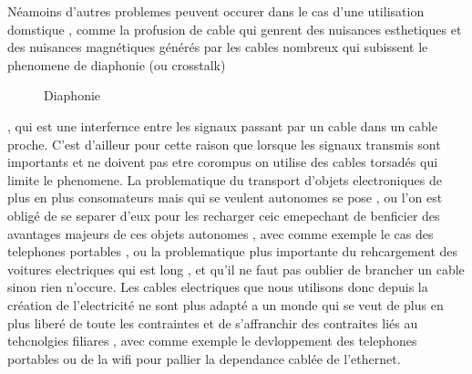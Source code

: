 \documentclass[12pt]{report}
\begin{document}
	Néamoins d'autres problemes peuvent occurer dans le cas d'une utilisation domstique , comme la profusion de cable qui genrent des nuisances esthetiques et des nuisances magnétiques générés par les cables nombreux qui subissent le phenomene de diaphonie (ou crosstalk)\cite{wiki4}
\begin{figure}
  \begin{center}
    \setlength\fboxsep{0pt}
    \setlength\fboxrule{0.5pt}
  \end{center}
  \caption{Diaphonie}
\end{figure}, qui est une interfernce entre les signaux passant par un cable dans un cable proche. C'est d'ailleur pour cette raison que lorsque les signaux transmis sont importants et ne doivent pas etre corompus on utilise des cables torsadés qui limite le phenomene. La problematique du transport d'objets electroniques de plus en plus consomateurs mais qui se veulent autonomes se pose , ou l'on est obligé de se separer d'eux pour les recharger ceic emepechant de benficier des avantages majeurs de ces objets autonomes , avec comme exemple le cas des telephones portables , ou la problematique plus importante du rehcargement des voitures electriques qui est long , et qu'il ne faut pas oublier de brancher un cable sinon rien n'occure. Les cables electriques que nous utilisons donc depuis la création de l'electricité ne sont plus adapté a un monde qui se veut de plus en plus liberé de toute les contraintes et de s'affranchir des contraites liés au tehcnolgies filiares , avec comme exemple le devloppement des telephones portables ou 
de la wifi pour pallier la dependance cablée de l'ethernet.
\end{document}
